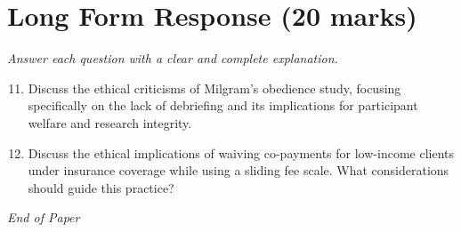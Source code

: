 \documentclass[12pt]{article}
\begin{document}
\section*{Long Form Response (20 marks)}
\textit{Answer each question with a clear and complete explanation.}
\begin{enumerate}[label=\arabic*.]
\setcounter{enumi}{10}
\item Discuss the ethical criticisms of Milgram's obedience study, focusing specifically on the lack of debriefing and its implications for participant welfare and research integrity.
\item Discuss the ethical implications of waiving co-payments for low-income clients under insurance coverage while using a sliding fee scale. What considerations should guide this practice?
\end{enumerate}

\vfill
\noindent\textit{End of Paper}
\end{document}

